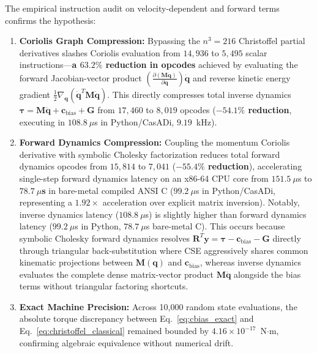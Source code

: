 \documentclass[fleqn,10pt]{article}
\begin{document}
The empirical instruction audit on velocity-dependent and forward terms confirms the hypothesis:
\begin{enumerate}
	\item \textbf{Coriolis Graph Compression:} Bypassing the $n^3 = 216$ Christoffel partial derivatives slashes Coriolis evaluation from $14,936$ to $5,495$ scalar instructions---\textbf{a $63.2\%$ reduction in opcodes} achieved by evaluating the forward Jacobian-vector product $\left(\frac{\partial (\bm{M}\dot{\bm{q}})}{\partial \bm{q}}\right)\dot{\bm{q}}$ and reverse kinetic energy gradient $\frac{1}{2}\nabla_{\bm{q}}(\dot{\bm{q}}^T\bm{M}\dot{\bm{q}})$. This directly compresses total inverse dynamics $\bm{\tau} = \bm{M}\ddot{\bm{q}} + \mathbf{c}_{\text{bias}} + \bm{G}$ from $17,460$ to $8,019$ opcodes (\textbf{$-54.1\%$ reduction}, executing in $108.8~\mu$s in Python/CasADi, $9.19$~kHz).
	\item \textbf{Forward Dynamics Compression:} Coupling the momentum Coriolis derivative with symbolic Cholesky factorization reduces total forward dynamics opcodes from $15,814$ to $7,041$ (\textbf{$-55.4\%$ reduction}), accelerating single-step forward dynamics latency on an x86-64 CPU core from $151.5~\mu$s to \textbf{$78.7~\mu$s} in bare-metal compiled ANSI C ($99.2~\mu$s in Python/CasADi, representing a $1.92\times$ acceleration over explicit matrix inversion). Notably, inverse dynamics latency ($108.8~\mu$s) is slightly higher than forward dynamics latency ($99.2~\mu$s in Python, $78.7~\mu$s bare-metal C). This occurs because symbolic Cholesky forward dynamics resolves $\bm{R}^T \bm{y} = \bm{\tau} - \mathbf{c}_{\text{bias}} - \bm{G}$ directly through triangular back-substitution where CSE aggressively shares common kinematic projections between $\bm{M}(\bm{q})$ and $\mathbf{c}_{\text{bias}}$, whereas inverse dynamics evaluates the complete dense matrix-vector product $\bm{M}\ddot{\bm{q}}$ alongside the bias terms without triangular factoring shortcuts.
	\item \textbf{Exact Machine Precision:} Across 10,000 random state evaluations, the absolute torque discrepancy between Eq.~\eqref{eq:cbias_exact} and Eq.~\eqref{eq:christoffel_classical} remained bounded by $4.16 \times 10^{-17}$~N$\cdot$m, confirming algebraic equivalence without numerical drift.
\end{enumerate}
\end{document}
